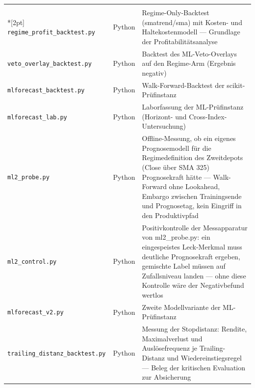 \begin{longtable}{@{}p{}p{}p{}@{}}
  \addlinespace[6pt]
  \multicolumn{3}{@{}l}{\textbf{Auswertung (Laborcode)}}\\*[2pt]
  \texttt{regime\_\allowbreak profit\_\allowbreak backtest.py} & Python & Regime-Only-Backtest (smatrend/sma) mit Kosten- und Haltekostenmodell — Grundlage der Profitabilitätsanalyse \\
  \texttt{veto\_\allowbreak overlay\_\allowbreak backtest.py} & Python & Backtest des ML-Veto-Overlays auf den Regime-Arm (Ergebnis negativ) \\
  \texttt{mlforecast\_\allowbreak backtest.py} & Python & Walk-Forward-Backtest der scikit-Prüfinstanz \\
  \texttt{mlforecast\_\allowbreak lab.py} & Python & Laborfassung der ML-Prüfinstanz (Horizont- und Cross-Index-Untersuchung) \\
  \texttt{ml2\_\allowbreak probe.py} & Python & Offline-Messung, ob ein eigenes Prognosemodell für die Regimedefinition des Zweitdepots (Close über SMA 325) Prognosekraft hätte — Walk-Forward ohne Lookahead, Embargo zwischen Trainingsende und Prognosetag, kein Eingriff in den Produktivpfad \\
  \texttt{ml2\_\allowbreak control.py} & Python & Positivkontrolle der Messapparatur von ml2\_probe.py: ein eingespeistes Leck-Merkmal muss deutliche Prognosekraft ergeben, gemischte Label müssen auf Zufallsniveau landen — ohne diese Kontrolle wäre der Negativbefund wertlos \\
  \texttt{mlforecast\_\allowbreak v2.py} & Python & Zweite Modellvariante der ML-Prüfinstanz \\
  \texttt{trailing\_\allowbreak distanz\_\allowbreak backtest.py} & Python & Messung der Stopdistanz: Rendite, Maximalverlust und Auslösefrequenz je Trailing-Distanz und Wiedereinstiegsregel — Beleg der kritischen Evaluation zur Absicherung \\
\end{longtable}
